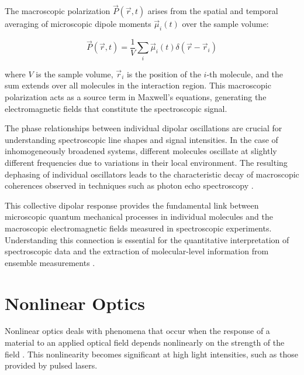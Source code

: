 \noindent The macroscopic polarization $\vec{P}(\vec{r}, t)$ arises from the spatial and temporal averaging of microscopic dipole moments $\vec{\mu}_i(t)$ over the sample volume:

\begin{equation}
    \vec{P}(\vec{r}, t) = \frac{1}{V} \sum_{i} \vec{\mu}_i(t) \delta(\vec{r} - \vec{r}_i)
    \label{eq:macroscopic_polarization}
\end{equation}

\noindent where $V$ is the sample volume, $\vec{r}_i$ is the position of the $i$-th molecule, and the sum extends over all molecules in the interaction region. This macroscopic polarization acts as a source term in Maxwell's equations, generating the electromagnetic fields that constitute the spectroscopic signal.

\noindent The phase relationships between individual dipolar oscillations are crucial for understanding spectroscopic line shapes and signal intensities. In the case of inhomogeneously broadened systems, different molecules oscillate at slightly different frequencies due to variations in their local environment. The resulting dephasing of individual oscillators leads to the characteristic decay of macroscopic coherences observed in techniques such as photon echo spectroscopy \cite{Mukamel1995PrinciplesNonlinearOptical}.

\noindent This collective dipolar response provides the fundamental link between microscopic quantum mechanical processes in individual molecules and the macroscopic electromagnetic fields measured in spectroscopic experiments. Understanding this connection is essential for the quantitative interpretation of spectroscopic data and the extraction of molecular-level information from ensemble measurements \cite{Feynman1965FeynmanLecturesPhysics}.


\section{Nonlinear Optics}
\label{sec:nonlinear_optics}

\noindent Nonlinear optics deals with phenomena that occur when the response of a material to an applied optical field depends nonlinearly on the strength of the field \cite{Boyd2008Contents}. This nonlinearity becomes significant at high light intensities, such as those provided by pulsed lasers.


